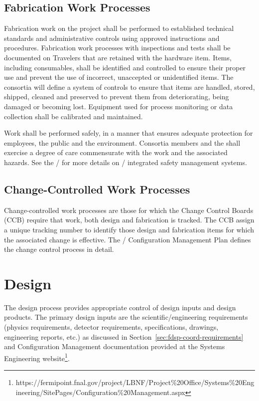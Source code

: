 \subsection{Fabrication Work Processes}

Fabrication work on the  project shall be performed to
established technical standards and administrative controls using
approved instructions and procedures. Fabrication work processes with
 inspections and tests shall be documented on Travelers that are
retained with the hardware item. Items, including consumables, shall
be identified and controlled to ensure their proper use and prevent
the use of incorrect, unaccepted or unidentified items. The consortia
will define a system of controls to ensure that items are handled,
stored, shipped, cleaned and preserved to prevent them from
deteriorating, being damaged or becoming lost. Equipment used for
process monitoring or data collection shall be calibrated and
maintained.

Work shall be performed safely, in a manner that ensures adequate
protection for employees, the public and the environment. Consortia
members and the   shall exercise a degree of
care commensurate with the work and the associated hazards. See the
/  for more details on
/ integrated safety management systems.

\subsection{Change-Controlled Work Processes}

Change-controlled work processes are those for which the 
Change Control Boards (CCB) require that work, both design and
fabrication is tracked. The CCB assign a unique tracking number to
identify those design and fabrication items for which the associated
change is effective. The / Configuration
Management Plan defines the change control process in detail.

\section{Design}

The  design process provides appropriate control of design
inputs and design products. The primary design inputs are the
 scientific/engineering requirements (physics
requirements, detector requirements, specifications, drawings,
engineering reports, etc.) as discussed in
Section~\ref{sec:fdsp-coord-requirements} and Configuration Management
documentation provided at the Systems Engineering
website\footnote{https://fermipoint.fnal.gov/project/LBNF/Project\%20Office/Systems\%20Engineering/SitePages/Configuration\%20Management.aspx}.

